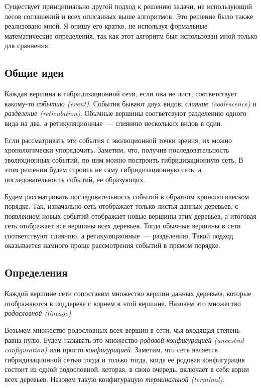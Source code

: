 \documentclass[14pt]{matmex-diploma-custom}
\begin{document}
    \bigskip

Существует принципиально другой подход к решению задачи, не использующий лесов соглашений и всех описанных выше алгоритмов. Это решение было также реализовано мной. Я опишу его кратко, не используя формальные математические определения, так как этот алгоритм был использован мной только для сравнения.
    \subsection{Общие идеи}
        Каждая вершина в гибридизационной сети, если она не лист, соответствует какому-то \textit{событию (event)}. События бывают двух видов: \textit{слияние (coalescence)} и \textit{разделение (reticulation)}. Обычные вершины соответсвуют разделению одного вида на два, а
        ретикуляционные~--- слиянию нескольких видов в один.
        
        Если рассматривать эти события с эволюционной точки зрения, их можно хронологически упорядочить. Заметим, что, получив последовательность эволюционных событий, по ним можно построить гибридизационную сеть. В этом решении будем строить не саму гибридизационную сеть, а последовательность событий, ее образующих.
        
        Будем рассматривать последовательность событий в обратном хронологическом порядке. Так, изначально сеть отображает только листья данных деревьев, с появлением новых событий отображает новые вершины этих деревьев, а итоговая сеть отображает все вершины всех деревьев. Тогда обычные вершины в сети соответствуют слиянию, а ретикуляционные~--- разделению. Такой подход оказывается намного проще рассмотрения событий в прямом порядке.
        
        \subsection{Определения}
        Каждой вершине сети сопоставим множество вершин данных деревьев, которые отображаются в поддереве с корнем в этой вершине. Назовем это множество \textit{родословной (lineage)}.
        
        Возьмем множество родословных всех вершин в сети, чья входящая степень равна нулю. Будем называть это множество \textit{родовой конфигурацией (ancestral configuration)} или просто \textit{конфигурацией}. Заметим, что сеть является гибридизационной сетью тогда и только тогда, когда ее родовая конфигурация состоит из одной родословной, которая, в свою очередь, включает в себя корни всех деревьев. Назовем такую конфигурацую \textit{терминальной (terminal)}.
        
\end{document}
